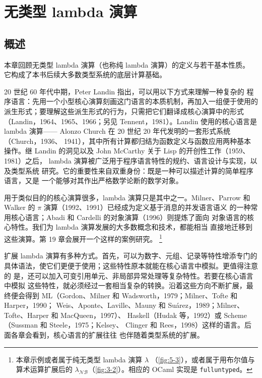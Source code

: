 
\chapter{无类型 lambda 演算}
\label{chap:5}

\section*{概述}

本章回顾无类型 lambda 演算（也称纯 lambda 演算）的定义与若干基本性质。
它构成了本书后续大多数类型系统的底层计算基础。

20 世纪 60 年代中期，Peter Landin 指出，可以用以下方式来理解一种复杂的
程序语言：先用一个小型核心演算刻画这门语言的本质机制，再加入一组便于使用的
派生形式；要理解这些派生形式的行为，只需把它们翻译成核心演算中的形式
（Landin，1964、1965、1966；另见 Tennent，1981）。Landin 使用的核心语言是
lambda 演算——
Alonzo Church 在 20 世纪 20 年代发明的一套形式系统（Church，1936、
1941），其中所有计算都归结为函数定义与函数应用两种基本操作。继 Landin
的洞见以及 John McCarthy 关于 Lisp 的开创性工作（1959、1981）之后，
lambda 演算被广泛用于程序语言特性的规约、语言设计与实现，以及类型系统
研究。它的重要性来自双重身份：既是一种可以描述计算的简单程序语言，又是
一个能够对其作出严格数学论断的数学对象。

用于类似目的的核心演算很多，lambda 演算只是其中之一。Milner、Parrow 和
Walker 的 \(\pi\) 演算（1992、1991）已经成为定义基于消息的并发语言语义
的一种常用核心语言；Abadi 和 Cardelli 的对象演算（1996）则提炼了面向
对象语言的核心特性。我们为 lambda 演算发展的大多数概念和技术，都能相当
直接地迁移到这些演算。第 19 章会展开一个这样的案例研究。
\footnote{本章示例或者属于纯无类型 lambda 演算 \(\lambda\)
（\cref{fig:5-3}），或者属于用布尔值与算术运算扩展后的
\(\lambda_{\mathcal{NB}}\)（\cref{fig:3-2}）。相应的 OCaml 实现是
\texttt{fulluntyped}。}

扩展 lambda 演算有多种方式。首先，可以为数字、元组、记录等特性增添专门的
具体语法，使它们更便于使用；这些特性原本就能在核心语言中模拟。更值得注意的
是，还可以加入可变引用单元、非局部异常处理等复杂特性。若要在核心语言中模拟
这些特性，就必须经过一套相当复杂的转换。沿着这些方向不断扩展，最终便会得到
ML（Gordon、Milner 和 Wadsworth，1979；Milner、Tofte 和 Harper，1990；
Weis、Aponte、Laville、Mauny 和 Suárez，1989；Milner、Tofte、Harper 和
MacQueen，1997）、
Haskell（Hudak 等，1992）或 Scheme（Sussman 和 Steele，1975；Kelsey、
Clinger 和 Rees，1998）这样的语言。后面各章会看到，核心语言的扩展往往
也伴随着类型系统的扩展。

